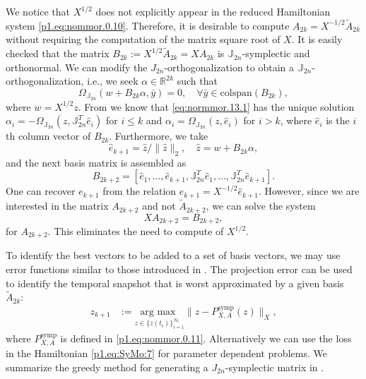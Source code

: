 We notice that $X^{1/2}$ does not explicitly appear in the reduced Hamiltonian system \eqref{p1.eq:nommor.0.10}. Therefore, it is desirable to compute $A_{2k} = X^{-1/2} \tilde A_{2k}$ without requiring the computation of the matrix square root of $X$. It is easily checked that the matrix $B_{2k}:=X^{1/2} \tilde A_{2k} = XA_{2k}$ is $\mathbb J_{2n}$-symplectic and orthonormal. We can modify the $J_{2n}$-orthogonalization to obtain a $\mathbb J_{2n}$-orthogonalization, i.e., we seek $\alpha \in \mathbb R^{2k}$ such that
\begin{equation} \label{eq:normmor.13.1}
	\Omega_{\mathbb J_{2n}}\left( w + B_{2k} \alpha, \bar y \right) = 0, \quad \forall \bar y \in \text{colspan}(B_{2k}),
\end{equation}
where $w = X^{1/2}z$. From  we know that \eqref{eq:normmor.13.1} has the unique solution $\alpha_i = - \Omega_{\mathbb J_{2n}}(z,\mathbb J_{2n}^T \hat e_i)$ for $i\leq k$ and $\alpha_i = \Omega_{\mathbb J_{2n}}(z,\hat e_i)$ for $i>k$, where $\hat e_i$ is the $i$th column vector of $B_{2k}$. Furthermore, we take 
\begin{equation}
	\hat e_{k+1} = \hat z / \| \hat z \|_2, \quad \hat z = w + B_{2k} \alpha,
\end{equation}
and the next basis matrix is assembled as
\begin{equation}
	B_{2k+2} = [ \hat e_1 , \dots , \hat e_{k+1} , \mathbb J_{2n}^T \hat e_1 , \dots , \mathbb J_{2n}^T \hat e_{k+1} ].
\end{equation}
One can recover $e_{k+1}$ from the relation $e_{k+1} = X^{-1/2} \hat e_{k+1}$. However, since we are interested in the matrix $A_{2k+2}$ and not $\tilde A_{2k+2}$, we can solve the system 
\begin{equation}
	XA_{2k+2} = B_{2k+2},
\end{equation}
for $A_{2k+2}$. This eliminates the need to compute of $X^{1/2}$.

To identify the best vectors to be added to a set of basis vectors, we may use error functions similar to those introduced in . The projection error can be used to identify the temporal snapshot that is worst approximated by a given basis $\tilde A_{2k}$:
\begin{equation} \label{eq:normmor.14}
\begin{aligned}
	z_{k+1} &:= \underset{z\in\{ z(t_i)\}_{i=1}^{N_t}}{\text{arg\ max } }\| z - P_{X,A}^{\text{symp}}(z) \|_X,
\end{aligned}
\end{equation}
where $P_{X,A}^{\text{symp}}$ is defined in \eqref{p1.eq:nommor.0.11}. Alternatively we can use the loss in the Hamiltonian \eqref{p1.eq:SyMo:7} for parameter dependent problems. We summarize the greedy method for generating a $J_{2n}$-symplectic matrix in .


